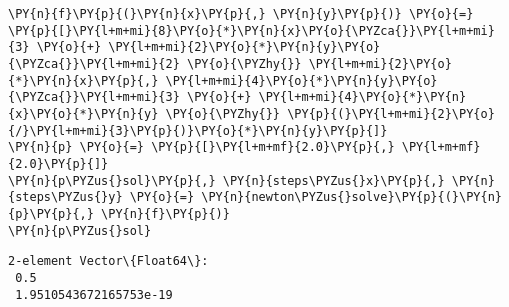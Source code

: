     \begin{tcolorbox}[breakable, size=fbox, boxrule=1pt, pad at break*=1mm,colback=cellbackground, colframe=cellborder]
\begin{Verbatim}[commandchars=\\\{\}]
\PY{n}{f}\PY{p}{(}\PY{n}{x}\PY{p}{,} \PY{n}{y}\PY{p}{)} \PY{o}{=} \PY{p}{[}\PY{l+m+mi}{8}\PY{o}{*}\PY{n}{x}\PY{o}{\PYZca{}}\PY{l+m+mi}{3} \PY{o}{+} \PY{l+m+mi}{2}\PY{o}{*}\PY{n}{y}\PY{o}{\PYZca{}}\PY{l+m+mi}{2} \PY{o}{\PYZhy{}} \PY{l+m+mi}{2}\PY{o}{*}\PY{n}{x}\PY{p}{,} \PY{l+m+mi}{4}\PY{o}{*}\PY{n}{y}\PY{o}{\PYZca{}}\PY{l+m+mi}{3} \PY{o}{+} \PY{l+m+mi}{4}\PY{o}{*}\PY{n}{x}\PY{o}{*}\PY{n}{y} \PY{o}{\PYZhy{}} \PY{p}{(}\PY{l+m+mi}{2}\PY{o}{/}\PY{l+m+mi}{3}\PY{p}{)}\PY{o}{*}\PY{n}{y}\PY{p}{]}
\PY{n}{p} \PY{o}{=} \PY{p}{[}\PY{l+m+mf}{2.0}\PY{p}{,} \PY{l+m+mf}{2.0}\PY{p}{]}
\PY{n}{p\PYZus{}sol}\PY{p}{,} \PY{n}{steps\PYZus{}x}\PY{p}{,} \PY{n}{steps\PYZus{}y} \PY{o}{=} \PY{n}{newton\PYZus{}solve}\PY{p}{(}\PY{n}{p}\PY{p}{,} \PY{n}{f}\PY{p}{)}
\PY{n}{p\PYZus{}sol}
\end{Verbatim}
\end{tcolorbox}

            \begin{tcolorbox}[breakable, size=fbox, boxrule=.5pt, pad at break*=1mm, opacityfill=0]
\begin{Verbatim}[commandchars=\\\{\}]
2-element Vector\{Float64\}:
 0.5
 1.9510543672165753e-19
\end{Verbatim}
\end{tcolorbox}